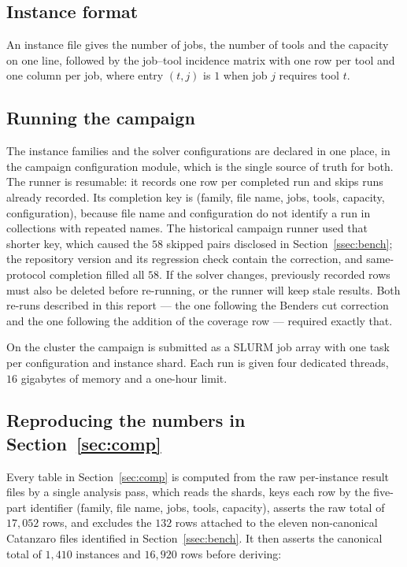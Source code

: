 \subsection{Instance format}\label{ssec:repro-format}

An instance file gives the number of jobs, the number of tools and the capacity on one
line, followed by the job--tool incidence matrix with one row per tool and one column
per job, where entry $(t,j)$ is $1$ when job $j$ requires tool $t$.

\subsection{Running the campaign}\label{ssec:repro-campaign}

The instance families and the solver configurations are declared in one place, in the
campaign configuration module, which is the single source of truth for both. The runner
is resumable: it records one row per completed run and skips runs already recorded. Its
completion key is (family, file name, jobs, tools, capacity, configuration), because
file name and configuration do not identify a run in collections with repeated names.
The historical campaign runner used that shorter key, which caused the $58$ skipped
pairs disclosed in Section~\ref{ssec:bench}; the repository version and its regression
check contain the correction, and same-protocol completion filled all $58$. If the solver changes, previously recorded rows must also
be deleted before re-running, or the runner will keep stale results. Both re-runs
described in this report --- the one following the Benders cut correction and the one
following the addition of the coverage row --- required exactly that.

On the cluster the campaign is submitted as a SLURM job array with one task per
configuration and instance shard. Each run is given four dedicated threads,
$16$ gigabytes of memory and a one-hour limit.

\subsection{Reproducing the numbers in Section~\ref{sec:comp}}\label{ssec:repro-numbers}

Every table in Section~\ref{sec:comp} is computed from the raw per-instance result
files by a single analysis pass, which reads the shards, keys each row by the
five-part identifier (family, file name, jobs, tools, capacity), asserts the raw total
of $17{,}052$ rows, and excludes the $132$ rows attached to the eleven non-canonical
Catanzaro files identified in Section~\ref{ssec:bench}. It then asserts the canonical
total of $1{,}410$ instances and $16{,}920$ rows before deriving:

